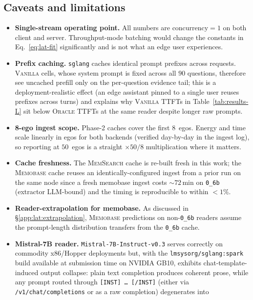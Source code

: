 \subsection{Caveats and limitations}
\label{app:lat:caveats}

\begin{itemize}
\setlength{\itemsep}{0pt}
\item \textbf{Single-stream operating point.} All numbers are
$\text{concurrency}=1$ on both client and server. Throughput-mode
batching would change the constants in Eq.~\ref{eq:lat-fit} significantly
and is not what an edge user experiences.
\item \textbf{Prefix caching.} \texttt{sglang} caches identical prompt
prefixes across requests. \textsc{Vanilla} cells, whose system prompt is
fixed across all $90$ questions, therefore see uncached prefill only on
the per-question evidence tail; this is a deployment-realistic effect
(an edge assistant pinned to a single user reuses prefixes across
turns) and explains why \textsc{Vanilla} TTFTs in Table~\ref{tab:results-L}
sit below \textsc{Oracle} TTFTs at the same reader despite longer raw
prompts.
\item \textbf{8-ego ingest scope.} Phase-2 caches cover the first
$8$~egos. Energy and time scale linearly in egos for both backends
(verified day-by-day in the ingest log), so reporting at $50$~egos is a
straight $\times 50/8$ multiplication where it matters.
\item \textbf{Cache freshness.} The \textsc{MemSearch} cache is
re-built fresh in this work; the \textsc{Memobase} cache reuses an
identically-configured ingest from a prior run on the same node since a
fresh memobase ingest costs $\sim\!72$\,min on \texttt{0\_6b} (extractor
LLM-bound) and the timing is reproducible to within $<\!1\%$.
\item \textbf{Reader-extrapolation for memobase.} As discussed in
\S\ref{app:lat:extrapolation}, \textsc{Memobase} predictions on
non-\texttt{0\_6b} readers assume the prompt-length distribution
transfers from the \texttt{0\_6b} cache.
\item \textbf{Mistral-7B reader.} \texttt{Mistral-7B-Instruct-v0.3}
serves correctly on commodity x86/Hopper deployments but, with the
\texttt{lmsysorg/sglang:spark} build available at submission time on
NVIDIA GB10, exhibits chat-template-induced output collapse: plain
text completion produces coherent prose, while any prompt routed
through \texttt{[INST]\,\dots\,[/INST]} (either via
\texttt{/v1/chat/completions} or as a raw completion) degenerates into

\end{itemize}
